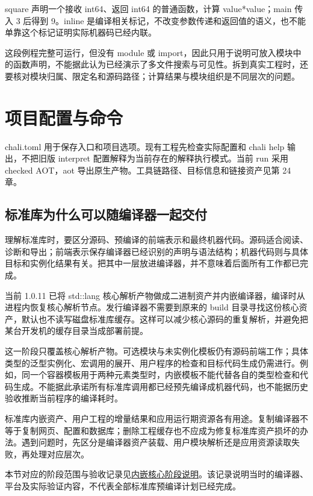 square 声明一个接收 int64、返回 int64 的普通函数，计算 value*value；main 传入 3 后得到 9。inline 是编译相关标记，不改变参数传递和返回值的语义，也不能单靠这个标记证明实际机器码已经内联。

这段例程完整可运行，但没有 module 或 import，因此只用于说明可放入模块中的函数声明，不能据此认为已经演示了多文件搜索与可见性。拆到真实工程时，还要核对模块归属、限定名和源码路径；计算结果与模块组织是不同层次的问题。

\section{项目配置与命令}

chali.toml 用于保存入口和项目选项。现有工程先检查实际配置和 chali help 输出，不把旧版 interpret 配置解释为当前存在的解释执行模式。当前 run 采用 checked AOT，aot 导出原生产物。工具链路径、目标信息和链接资产见第 24 章。

\subsection*{标准库为什么可以随编译器一起交付}

理解标准库时，要区分源码、预编译的前端表示和最终机器代码。源码适合阅读、诊断和导出；前端表示保存编译器已经识别的声明与语法结构；机器代码则与具体目标和实例化结果有关。把其中一层放进编译器，并不意味着后面所有工作都已完成。

当前 1.0.11 已将 std::lang 核心解析产物做成二进制资产并内嵌编译器，编译时从进程内恢复核心解析节点。发行编译器不需要到原来的 build 目录寻找这份核心资产，默认也不读写磁盘标准库缓存。这样可以减少核心源码的重复解析，并避免把某台开发机的缓存目录当成部署前提。

这一阶段只覆盖核心解析产物。可选模块与未实例化模板仍有源码前端工作；具体类型的泛型实例化、宏调用的展开、用户程序的检查和目标代码生成仍需进行。例如，同一个容器模板用于两种元素类型时，内嵌模板不能代替各自的类型检查和代码生成。不能据此承诺所有标准库调用都已经预先编译成机器代码，也不能据历史验收推断当前程序的编译耗时。

标准库内嵌资产、用户工程的增量结果和应用运行期资源各有用途。复制编译器不等于复制网页、配置和数据库；删除工程缓存也不应成为修复标准库资产损坏的办法。遇到问题时，先区分是编译器资产装载、用户模块解析还是应用资源读取失败，再处理对应层次。

本节对应的阶段范围与验收记录见\href{https://github.com/rabbitc999/ChaLi/blob/master/tools/history/20261030/chali-1.0.11-precompiled-core/README.md}{内嵌核心阶段说明}。该记录说明当时的编译器、平台及实际验证内容，不代表全部标准库预编译计划已经完成。

